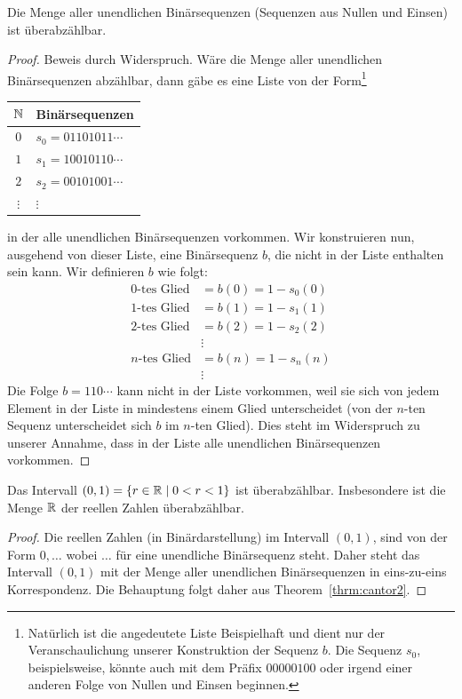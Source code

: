 \begin{thrm}\label{thrm:cantor2}
Die Menge aller unendlichen Binärsequenzen (Sequenzen aus Nullen und Einsen) ist überabzählbar.
\end{thrm}
\begin{proof}
Beweis durch Widerspruch. Wäre die Menge aller unendlichen Binärsequenzen abzählbar, dann gäbe es eine Liste von der Form\footnote{Natürlich ist die angedeutete Liste Beispielhaft und dient nur der Veranschaulichung unserer Konstruktion der Sequenz $b$. Die Sequenz $s_0$, beispielsweise, könnte auch mit dem Präfix $00000100$ oder irgend einer anderen Folge von Nullen und Einsen beginnen. }
\begin{center}
\begin{tabular}{c|l}
$\mathbb{N}$ & Binärsequenzen\\
\hline
$0$ & $s_0=01101011\cdots$\\
$1$ & $s_1=10010110\cdots$\\
$2$ & $s_2=00101001\cdots$\\
$\vdots$ & $\vdots$
\end{tabular}
\end{center}
in der alle unendlichen Binärsequenzen vorkommen. Wir konstruieren nun, ausgehend von dieser Liste, eine Binärsequenz $b$, die nicht in der Liste enthalten sein kann. Wir definieren $b$ wie folgt:
\begin{align*}
0\text{-tes Glied}&=b(0)=1-s_0(0)\\
1\text{-tes Glied}&=b(1)=1-s_1(1)\\
2\text{-tes Glied}&=b(2)=1-s_2(2)\\
&\vdots\\
n\text{-tes Glied}&=b(n)=1-s_n(n)\\
&\vdots
\end{align*}
Die Folge $b=110\cdots$ kann nicht in der Liste vorkommen, weil sie sich von jedem Element in der Liste in mindestens einem Glied unterscheidet (von der $n$-ten Sequenz unterscheidet sich $b$ im $n$-ten Glied). Dies steht im Widerspruch zu unserer Annahme, dass in der Liste alle unendlichen Binärsequenzen vorkommen.
\end{proof}


\begin{cor}
Das Intervall $(0,1)=\{r\in\mathbb{R}\mid 0<r<1 \}$ ist überabzählbar. Insbesondere ist die Menge $\mathbb{R}$ der reellen Zahlen überabzählbar.
\end{cor}
\begin{proof}
Die reellen Zahlen (in Binärdarstellung) im Intervall $(0,1)$, sind von der Form $0,\dots$ wobei $\dots$ für eine unendliche Binärsequenz steht. Daher steht das Intervall $(0,1)$ mit der Menge aller unendlichen Binärsequenzen in eins-zu-eins Korrespondenz. Die Behauptung folgt daher aus Theorem~\ref{thrm:cantor2}.
\end{proof}

